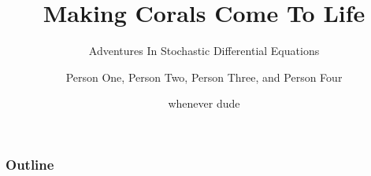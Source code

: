 \documentclass{beamer}
\begin{document}
\author{Person One, Person Two, Person Three, and Person Four}

\title{Making Corals Come To Life}
\subtitle{Adventures In Stochastic Differential Equations}
\date{whenever dude}

\begin{frame}
  \titlepage
\end{frame}

\begin{frame}
  \frametitle{Outline}
  \tableofcontents
\end{frame}






\end{document}
